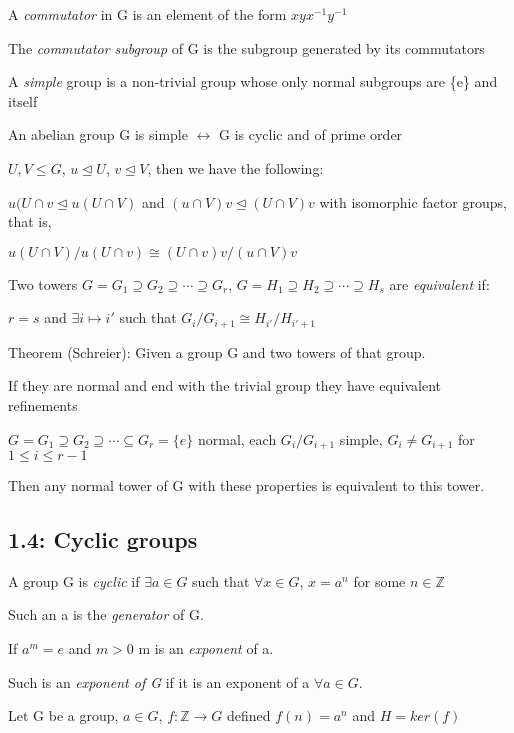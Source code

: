 \documentclass[12pt]{article}
\begin{document}
\noindent
A \textit{commutator} in G is an element of the form $xyx^{-1}y^{-1}$

The \textit{commutator subgroup} of G is the subgroup generated by its commutators

\noindent
A \textit{simple} group is a non-trivial group whose only normal subgroups are \{e\} and itself

An abelian group G is simple $\leftrightarrow$ G is cyclic and of prime order

\noindent
$U, V \leq G$, $u \trianglelefteq U$, $v \trianglelefteq V$, then we have the following:

$u(U \cap v \trianglelefteq u(U \cap V)$ and $(u \cap V)v \trianglelefteq (U \cap V)v$ with isomorphic factor groups, that is,

$u(U \cap V)\slash u(U \cap v) \cong (U \cap v)v\slash(u \cap V)v$

\noindent
Two towers $G = G_1 \supseteq G_2 \supseteq \cdots \supseteq G_r$, $G = H_1 \supseteq H_2 \supseteq \cdots \supseteq H_s$ are \textit{equivalent} if:

$r = s$ and $\exists i \mapsto i'$ such that $G_i\slash G_{i+1} \cong H_{i'}\slash H_{i'+1}$

\noindent
Theorem (Schreier): Given a group G and two towers of that group.

If they are normal and end with the trivial group they have equivalent refinements

\noindent
$G = G_1 \supseteq G_2 \supseteq \cdots \subseteq G_r = \{e\}$ normal, each $G_i/G_{i+1}$ simple, $G_i \neq G_{i+1}$ for $1 \leq i \leq r - 1$

Then any normal tower of G with these properties is equivalent to this tower.

\subsection{1.4: Cyclic groups}

A group G is \textit{cyclic} if $\exists a \in G$ such that $\forall x \in G$, $x = a^n$ for some $n \in \mathds{Z}$

Such an a is the \textit{generator} of G.

If $a^m = e$ and $m > 0$ m is an \textit{exponent} of a.

Such is an \textit{exponent of G} if it is an exponent of a $\forall a \in G$.

\noindent
Let G be a group, $a \in G$, $f: \mathds{Z} \to G$ defined $f(n) = a^n$ and $H = ker(f)$
\end{document}
